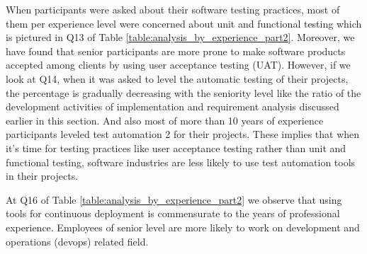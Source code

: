 When participants were asked about their software testing practices, most of them per experience level were concerned about unit and functional testing which is pictured in Q13 of Table \ref{table:analysis_by_experience_part2}. Moreover, we have found that senior participants are more prone to make software products accepted among clients by using user acceptance testing (UAT). However, if we look at Q14, when it was asked to level the automatic testing of their projects, the percentage is gradually decreasing  with the seniority level like the ratio of the development activities of implementation and requirement analysis discussed earlier in this section. And also most of more than 10 years of experience participants leveled test automation 2 for their projects. These implies that when it's time for testing practices like user acceptance testing rather than unit and functional testing, software industries are less likely to use test automation tools in their projects.

At Q16 of Table \ref{table:analysis_by_experience_part2} we observe that using tools for continuous deployment is commensurate to the years of professional experience. Employees of senior level are more likely to work on development and operations (devops) related field.